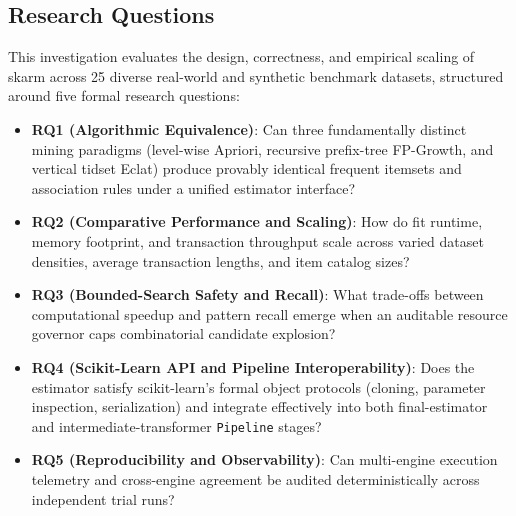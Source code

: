 \documentclass[twocolumn,10pt]{article}
\newcommand{\skarm}{\textsf{skarm}\xspace}
\begin{document}
\subsection{Research Questions}
\label{sec:rqs}
This investigation evaluates the design, correctness, and empirical scaling of \skarm across 25 diverse real-world and synthetic benchmark datasets, structured around five formal research questions:
\begin{itemize}
  \item \textbf{RQ1 (Algorithmic Equivalence)}: Can three fundamentally distinct mining paradigms (level-wise Apriori, recursive prefix-tree FP-Growth, and vertical tidset Eclat) produce provably identical frequent itemsets and association rules under a unified estimator interface?
  \item \textbf{RQ2 (Comparative Performance and Scaling)}: How do fit runtime, memory footprint, and transaction throughput scale across varied dataset densities, average transaction lengths, and item catalog sizes?
  \item \textbf{RQ3 (Bounded-Search Safety and Recall)}: What trade-offs between computational speedup and pattern recall emerge when an auditable resource governor caps combinatorial candidate explosion?
  \item \textbf{RQ4 (Scikit-Learn API and Pipeline Interoperability)}: Does the estimator satisfy scikit-learn's formal object protocols (cloning, parameter inspection, serialization) and integrate effectively into both final-estimator and intermediate-transformer \texttt{Pipeline} stages?
  \item \textbf{RQ5 (Reproducibility and Observability)}: Can multi-engine execution telemetry and cross-engine agreement be audited deterministically across independent trial runs?
\end{itemize}
\end{document}
